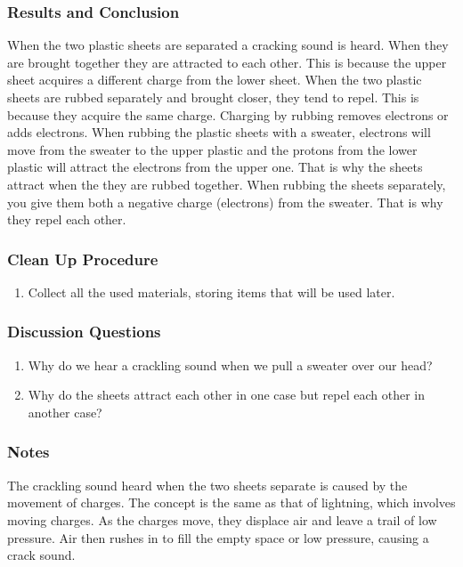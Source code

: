 \subsubsection*{Results and Conclusion}
When the two plastic sheets are separated a cracking sound is heard. When they are brought together they are attracted to each other. This is because the upper sheet acquires a different charge from the lower sheet.  
When the two plastic sheets are rubbed separately and brought closer, they tend to repel. This is because they acquire the same charge. 
Charging by rubbing removes electrons or adds electrons. When rubbing the plastic sheets with a sweater, electrons will move from the sweater to the upper plastic and the protons from the lower plastic will attract the electrons from the upper one. That is why the sheets attract when the they are rubbed together. When rubbing the sheets separately, you give them both a negative charge (electrons) from the sweater. That is why they repel each other.  

\subsubsection*{Clean Up Procedure}
\begin{enumerate}
\item{Collect all the used materials, storing items that will be used later.} 
\end{enumerate}

\subsubsection*{Discussion Questions}
\begin{enumerate}
\item{Why do we hear a crackling sound when we pull a sweater over our head?}
\item{Why do the sheets attract each other in one case but repel each other in another case?}
\end{enumerate}

\subsubsection*{Notes}
The crackling sound heard when the two sheets separate is caused by the movement of charges. The concept is the same as that of lightning, which involves moving charges. As the charges move, they displace air and leave a trail of low pressure. Air then rushes in to fill the empty space or low pressure, causing a crack sound.  

